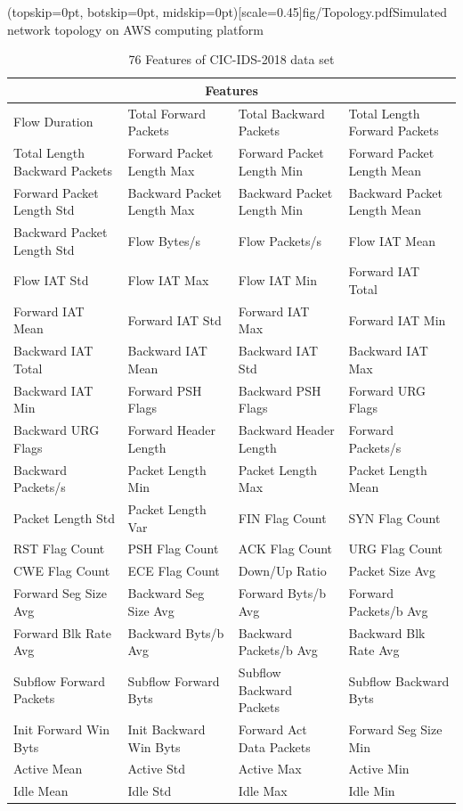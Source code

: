 \documentclass{ieeeaccess}
\theoremstyle{definition}
\begin{document}
\Figure[h](topskip=0pt, botskip=0pt, midskip=0pt)[scale=0.45]{fig/Topology.pdf}{Simulated network topology on AWS computing platform\label{fig:topology}}

\begin{table}[!htpb]
    \caption{76 Features of CIC-IDS-2018 data set}
    \label{tab:features}
    \centering
    \begin{tabular}{llll}
    \toprule
    \multicolumn{4}{c}{Features} \\
    \midrule
    Flow Duration & Total Forward Packets & Total Backward Packets & Total Length Forward Packets \\
    Total Length Backward Packets & Forward Packet Length Max & Forward Packet Length Min & Forward Packet Length Mean \\
    Forward Packet Length Std & Backward Packet Length Max & Backward Packet Length Min & Backward Packet Length Mean \\
    Backward Packet Length Std & Flow Bytes/s & Flow Packets/s & Flow IAT Mean \\
    Flow IAT Std & Flow IAT Max & Flow IAT Min & Forward IAT Total \\
    Forward IAT Mean & Forward IAT Std & Forward IAT Max & Forward IAT Min \\
    Backward IAT Total & Backward IAT Mean & Backward IAT Std & Backward IAT Max \\
    Backward IAT Min & Forward PSH Flags & Backward PSH Flags & Forward URG Flags \\
    Backward URG Flags & Forward Header Length & Backward Header Length & Forward Packets/s \\
    Backward Packets/s & Packet Length Min & Packet Length Max & Packet Length Mean \\
    Packet Length Std &  Packet Length Var & FIN Flag Count & SYN Flag Count \\
    RST Flag Count & PSH Flag Count & ACK Flag Count & URG Flag Count \\
    CWE Flag Count & ECE Flag Count & Down/Up Ratio & Packet Size Avg \\
    Forward Seg Size Avg & Backward Seg Size Avg & Forward Byts/b Avg & Forward Packets/b Avg \\
    Forward Blk Rate Avg & Backward Byts/b Avg & Backward Packets/b Avg & Backward Blk Rate Avg \\
    Subflow Forward Packets & Subflow Forward Byts & Subflow Backward Packets & Subflow Backward Byts \\
    Init Forward Win Byts &  Init Backward Win Byts &   Forward Act Data Packets & Forward Seg Size Min \\
    Active Mean & Active Std & Active Max & Active Min \\
    Idle Mean & Idle Std & Idle Max & Idle Min \\
    \bottomrule
    \end{tabular}


\end{table}
\end{document}
